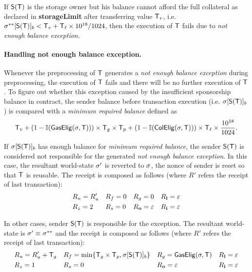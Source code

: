 If $\mathsf{S}{\left({\textsf{T}} \right)}$ is the storage owner but his balance cannot afford the full collateral as declared in {\bf storageLimit} after transferring value $\textsf{T}_v$, 
i.e. $\mathbf{\sigma}^{**}[\mathsf{S}{\left({\textsf{T}} \right)}]_b<\textsf{T}_v+\textsf{T}_\ell\times 10^{18}/1024$, 
then the execution of $\textsf{T}$ fails due to \emph{not enough balance exception}. 

\paragraph{Handling not enough balance exception.} 

Whenever the preprocessing of $\textsf{T}$ generates a \emph{not enough balance exception} during preprocessing, the execution of $\textsf{T}$ fails and there will be no further execution of $\textsf{T}$. To figure out whether this exception caused by the insufficient sponsorship balance in contract, the sender balance before transaction execution (i.e. $\mathbf{\sigma}[\mathsf{S}{\left({\textsf{T}} \right)}]_b$) is compared with a \emph{minimum required balance} defined as
\begin{align}
	\textsf{T}_v+(1-\mathbb{I}(\mathsf{GasElig}(\mathbf{\sigma},\textsf{T})))\times \textsf{T}_g \times \textsf{T}_p + (1-\mathbb{I}(\mathsf{ColElig}(\mathbf{\sigma},\textsf{T})))\times \textsf{T}_\ell \times \frac{10^{18}}{1024}.
\end{align}

If $\mathbf{\sigma}[\mathsf{S}{\left({\textsf{T}} \right)}]_b$ has enough balance for \emph{minimum required balance}, the sender $\mathsf{S}{\left({\textsf{T}} \right)}$ is considered not responsible for the generated \emph{not enough balance exception}. 
In this case, the resultant world-state $\mathbf{\sigma}'$ is reverted to $\mathbf{\sigma}$, the nonce of sender is reset so that $\textsf{T}$ is reusable. The receipt is composed as follows (where $R'$ refers the receipt of last transaction):
\begin{align}
	&R_u=R'_u && R_f=0 && R_g=0 && R_{\bf l}=\mathbb{\varepsilon} \\
	&R_z=2 && R_s=0 && R_{\bf o}=\mathbb{\varepsilon} && R_{\bf i}=\mathbb{\varepsilon}
\end{align}

In other cases, sender $\mathsf{S}{\left({\textsf{T}} \right)}$ is responsible for the exception. The resultant world-state is $\mathbf{\sigma}'\equiv \mathbf{\sigma}^{**}$ and the receipt is composed as follows (where $R'$ refers the receipt of last transaction):
\begin{align}
	&R_u=R'_u+\textsf{T}_g && R_f=\min\{\textsf{T}_g\times\textsf{T}_p,\mathbf{\sigma}[\mathsf{S}{\left({\textsf{T}} \right)}]_b\} && R_g=\mathsf{GasElig}(\mathbf{\sigma},\textsf{T}) && R_{\bf l}=\mathbb{\varepsilon} \\
	&R_z=1 && R_s=0 && R_{\bf o}=\mathbb{\varepsilon} && R_{\bf i}=\mathbb{\varepsilon}
\end{align}


